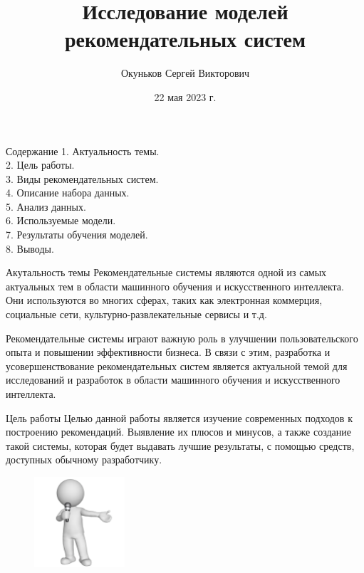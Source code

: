 \documentclass{beamer}
\title{Исследование моделей рекомендательных систем}
\author[Окуньков С.В.]{Окуньков Сергей Викторович}
\institute[СГУ]{Саратовский Государственный Университет}
\date{22 мая 2023 г.}
\begin{document}
\maketitle

\begin{frame}{Содержание}
  1. Актуальность темы. \\
  2. Цель работы. \\
  3. Виды рекомендательных систем. \\
  4. Описание набора данных. \\
  5. Анализ данных. \\
  6. Используемые модели. \\
  7. Результаты обучения моделей. \\
  8. Выводы. \\
\end{frame}

\begin{frame}{Акутальность темы}
  Рекомендательные системы являются одной из самых актуальных тем в области машинного обучения и искусственного интеллекта.
  Они используются во многих сферах, таких как электронная коммерция, социальные сети, культурно-развлекательные сервисы и т.д.

  Рекомендательные системы играют важную роль в улучшении пользовательского опыта и повышении эффективности бизнеса.
  В связи с этим, разработка и усовершенствование рекомендательных систем является актуальной темой для исследований
  и разработок в области машинного обучения и искусственного интеллекта.
\end{frame}

\begin{frame}{Цель работы}
  Целью данной работы является изучение современных подходов к построению рекомендаций. Выявление их плюсов и минусов,
  а также создание такой системы, которая будет выдавать лучшие результаты, с помощью средств, доступных обычному
  разработчику.
  \begin{figure}[H]
    \centering
    \includegraphics[width=0.3\textwidth]{pic/1}
    \label{fig:img1}
  \end{figure}
\end{frame}
\end{document}
